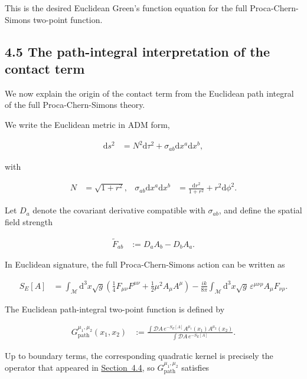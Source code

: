 This is the desired Euclidean Green's function equation for the full Proca-Chern-Simons two-point function.

\subsection{4.5 The path-integral interpretation of the contact term}\label{subsec:path-integral-contact-term}

We now explain the origin of the contact term from the Euclidean path integral of the full Proca-Chern-Simons theory.

We write the Euclidean metric in ADM form,

\begin{align}
\mathrm{d}s^{2} & =N^{2}\mathrm{d}\tau ^{2}+\sigma _{ab}\mathrm{d}x^{a}\mathrm{d}x^{b},
\end{align}

with

\begin{align}
N & =\sqrt{ 1+r^{2} }, & \sigma _{ab}\mathrm{d}x^{a}\mathrm{d}x^{b} & =\frac{\mathrm{d}r^{2}}{1+r^{2}}+r^{2}\mathrm{d}\phi ^{2}.
\end{align}

Let $D_{a}$ denote the covariant derivative compatible with $\sigma _{ab}$, and define the spatial field strength

\begin{align}
\widetilde{F}_{ab} & :=D_{a}A_{b}-D_{b}A_{a}.
\end{align}

In Euclidean signature, the full Proca-Chern-Simons action can be written as

\begin{align}
S_{E}[A] & =\int _{\mathcal{M}}\mathrm{d}^{3}x\sqrt{ g }\left(\frac{1}{4}F_{\mu \nu}F^{\mu \nu}+\frac{1}{2}\mu ^{2}A_{\mu}A^{\mu}\right)-\frac{ik}{8\pi}\int _{\mathcal{M}}\mathrm{d}^{3}x\sqrt{ g }\,\varepsilon ^{\mu \nu \rho}A_{\mu}F_{\nu \rho}.
\end{align}

The Euclidean path-integral two-point function is defined by

\begin{align}
G_{\mathrm{path}}^{\mu _{1},\mu _{2}}(x_{1},x_{2}) & :=\frac{\displaystyle{\int \mathcal{D}A\,e^{-S_{E}[A]}A^{\mu _{1}}(x_{1})A^{\mu _{2}}(x_{2})}}{\displaystyle{\int \mathcal{D}A\,e^{-S_{E}[A]}}}.
\end{align}

Up to boundary terms, the corresponding quadratic kernel is precisely the operator that appeared in \hyperref[subsec:covariant-green-function-check]{Section~4.4}, so $G_{\mathrm{path}}^{\mu _{1},\mu _{2}}$ satisfies

